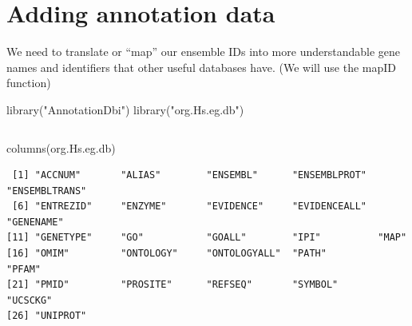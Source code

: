 \documentclass[
  letterpaper,
  DIV=11,
  numbers=noendperiod]{scrartcl}
\newenvironment{Shaded}{\begin{snugshade}}{\end{snugshade}}
\newcommand{\AttributeTok}[1]{\textcolor[rgb]{0.40,0.45,0.13}{#1}}
\newcommand{\CommentTok}[1]{\textcolor[rgb]{0.37,0.37,0.37}{#1}}
\newcommand{\FunctionTok}[1]{\textcolor[rgb]{0.28,0.35,0.67}{#1}}
\newcommand{\NormalTok}[1]{\textcolor[rgb]{0.00,0.23,0.31}{#1}}
\newcommand{\OtherTok}[1]{\textcolor[rgb]{0.00,0.23,0.31}{#1}}
\newcommand{\SpecialCharTok}[1]{\textcolor[rgb]{0.37,0.37,0.37}{#1}}
\newcommand{\StringTok}[1]{\textcolor[rgb]{0.13,0.47,0.30}{#1}}
\begin{document}
\hypertarget{adding-annotation-data}{%
\section{Adding annotation data}\label{adding-annotation-data}}

We need to translate or ``map'' our ensemble IDs into more
understandable gene names and identifiers that other useful databases
have. (We will use the mapID function)

\begin{Shaded}
\begin{Highlighting}[]
\FunctionTok{library}\NormalTok{(}\StringTok{"AnnotationDbi"}\NormalTok{)}
\FunctionTok{library}\NormalTok{(}\StringTok{"org.Hs.eg.db"}\NormalTok{)}
\end{Highlighting}
\end{Shaded}

\begin{verbatim}
\end{verbatim}

\begin{Shaded}
\begin{Highlighting}[]
\FunctionTok{columns}\NormalTok{(org.Hs.eg.db)}
\end{Highlighting}
\end{Shaded}

\begin{verbatim}
 [1] "ACCNUM"       "ALIAS"        "ENSEMBL"      "ENSEMBLPROT"  "ENSEMBLTRANS"
 [6] "ENTREZID"     "ENZYME"       "EVIDENCE"     "EVIDENCEALL"  "GENENAME"    
[11] "GENETYPE"     "GO"           "GOALL"        "IPI"          "MAP"         
[16] "OMIM"         "ONTOLOGY"     "ONTOLOGYALL"  "PATH"         "PFAM"        
[21] "PMID"         "PROSITE"      "REFSEQ"       "SYMBOL"       "UCSCKG"      
[26] "UNIPROT"     
\end{verbatim}

\begin{Shaded}
\end{Shaded}
\end{document}
